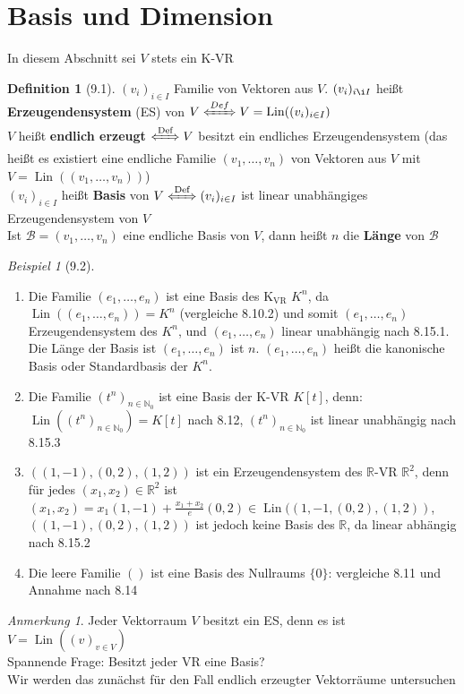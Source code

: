 \documentclass[a4paper]{scrartcl}
\DeclareMathOperator{\Lin}{Lin}
\theoremstyle{definition}
\newtheorem{defn}{Definition}
\theoremstyle{plain}
\theoremstyle{plain}
\theoremstyle{remark}
\theoremstyle{remark}
\newtheorem{note}{Anmerkung}
\theoremstyle{remark}
\theoremstyle{remark}
\theoremstyle{remark}
\newtheorem{ex}{Beispiel}
\begin{document}
\section{Basis und Dimension}
\label{sec-6}
In diesem Abschnitt sei $V$ stets ein K-VR
\begin{defn}[9.1]
$(v_i)_{i\in I}$ Familie von Vektoren aus $V$. $(v_i)_{i\i I}$ heißt \textbf{Erzeugendensystem} (ES) von $V \xLeftrightarrow{Def} V = \Lin((v_i)_{i\in I})$ \\
  $V$ heißt \textbf{endlich erzeugt} $\xLeftrightarrow{\text{Def}} V$ besitzt ein endliches Erzeugendensystem (das heißt es existiert eine endliche Familie $(v_1, \ldots, v_n)$ von Vektoren aus $V$ mit $V = \Lin((v_1, \ldots, v_n))$) \\
  $(v_i)_{i\in I}$ heißt \textbf{Basis} von $V \xLeftrightarrow{\text{Def}} (v_i)_{i\in I}$ ist linear unabhängiges Erzeugendensystem von $V$ \\
  Ist $\mathcal{B} = (v_1, \ldots, v_n)$ eine endliche Basis von $V$, dann heißt $n$ die \textbf{Länge} von $\mathcal{B}$
\end{defn}
\begin{ex}[9.2]
\begin{enumerate}
\item Die Familie $(e_1, \ldots, e_n)$ ist eine Basis des K$_{\text{VR}}$ $K^n$, da $\Lin((e_1, \ldots, e_n)) = K^n$ (vergleiche 8.10.2) und somit $(e_1,\ldots, e_n)$ Erzeugendensystem des $K^n$, und $(e_1, \ldots, e_n)$ linear unabhängig nach 8.15.1.
Die Länge der Basis ist $(e_1, \ldots, e_n)$ ist $n$. $(e_1, \ldots, e_n)$ heißt die kanonische Basis oder Standardbasis der $K^n$.
\item Die Familie $(t^n)_{n\in\mathbb{N}_0}$ ist eine Basis der K-VR $K[t]$, denn: $\Lin((t^n)_{n\in\mathbb{N}_0}) = K[t]$ nach 8.12, $(t^n)_{n\in\mathbb{N}_0}$ ist linear unabhängig nach 8.15.3
\item $((1, -1), (0,2), (1,2))$ ist ein Erzeugendensystem des $\mathbb{R}$-VR $\mathbb{R}^2$, denn für jedes $(x_1, x_2) \in \mathbb{R}^2$ ist $(x_1, x_2) = x_1(1, -1) + \frac{x_1 + x_2}{e}(0,2)\in \Lin((1,-1, (0,2), (1,2))$,
$((1, -1), (0,2), (1,2))$ ist jedoch keine Basis des $\mathbb{R}$, da linear abhängig nach 8.15.2
\item Die leere Familie $()$ ist eine Basis des Nullraums $\{0\}$: vergleiche 8.11 und Annahme nach 8.14
\end{enumerate}
\end{ex}
\begin{note}
Jeder Vektorraum $V$ besitzt ein ES, denn es ist $V = \Lin((v)_{v \in V})$ \\
  Spannende Frage: Besitzt jeder VR eine Basis? \\
  Wir werden das zunächst für den Fall endlich erzeugter Vektorräume untersuchen
\end{note}
\end{document}
